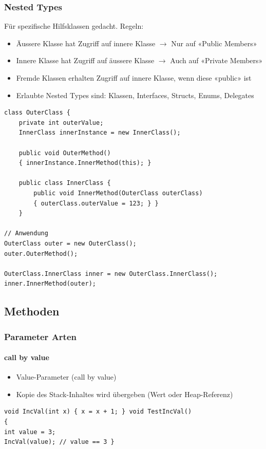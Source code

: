 \subsubsection{Nested Types}
Für spezifische Hilfsklassen gedacht. Regeln:
\begin{itemize}
    \item Äussere Klasse hat Zugriff auf innere Klasse $\rightarrow$ Nur auf «Public Members»
    \item Innere Klasse hat Zugriff auf äussere Klasse $\rightarrow$ Auch auf «Private Members»
    \item Fremde Klassen erhalten Zugriff auf innere Klasse, wenn diese «public» ist
    \item Erlaubte Nested Types sind: Klassen, Interfaces, Structs, Enums, Delegates
\end{itemize}
\begin{lstlisting}
class OuterClass {
    private int outerValue;
    InnerClass innerInstance = new InnerClass();

    public void OuterMethod()
    { innerInstance.InnerMethod(this); }

    public class InnerClass {
        public void InnerMethod(OuterClass outerClass)
        { outerClass.outerValue = 123; } }
    }

// Anwendung
OuterClass outer = new OuterClass();
outer.OuterMethod();

OuterClass.InnerClass inner = new OuterClass.InnerClass();
inner.InnerMethod(outer);
\end{lstlisting}


\subsection{Methoden}
\subsubsection{Parameter Arten}
\paragraph{call by value}
\begin{itemize}
    \item Value-Parameter (call by value)
    \item Kopie des Stack-Inhaltes wird übergeben (Wert oder Heap-Referenz)
\end{itemize}
\begin{lstlisting}
void IncVal(int x) { x = x + 1; } void TestIncVal()
{
int value = 3;
IncVal(value); // value == 3 }
\end{lstlisting}

